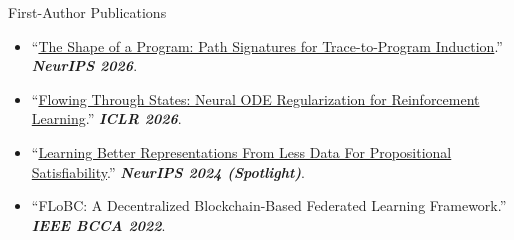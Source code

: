 \documentclass[]{mcdowellcv}
\begin{document}
	\makeheader
	
	\begin{cvsection}{First-Author Publications}
		\begin{cvsubsection}{}{}{}
			\begin{itemize}
				\item ``\href{https://oschart.github.io/program-signature/}{The Shape of a Program: Path Signatures for Trace-to-Program Induction}.'' \textbf{\textit{NeurIPS 2026}}.
				\item ``\href{https://arxiv.org/abs/2608.06595}{Flowing Through States: Neural ODE Regularization for Reinforcement Learning}.'' \textbf{\textit{ICLR 2026}}.
				\item ``\href{https://arxiv.org/abs/2402.08365}{Learning Better Representations From Less Data For Propositional Satisfiability}.'' \textbf{\textit{NeurIPS 2024 (Spotlight)}}.
				\item ``FLoBC: A Decentralized Blockchain-Based Federated Learning Framework.'' \textbf{\textit{IEEE BCCA 2022}}.
			\end{itemize}
		\end{cvsubsection}
	\end{cvsection}
\end{document}
